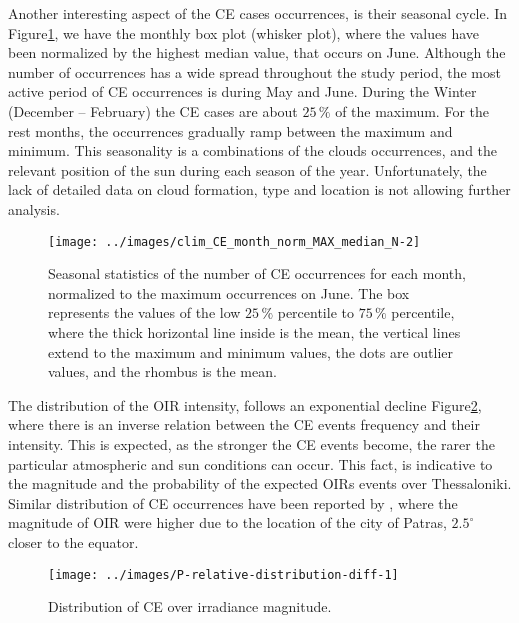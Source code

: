 \documentclass[preprint, 5p,
authoryear]{elsarticle} %
\begin{document}
Another interesting aspect of the CE cases occurrences, is their
seasonal cycle. In
Figure\nobreakspace{}\ref{fig:relative-month-occurrences}, we have the
monthly box plot (whisker plot), where the values have been normalized
by the highest median value, that occurs on June. Although the number of
occurrences has a wide spread throughout the study period, the most
active period of CE occurrences is during May and June. During the
Winter (December -- February) the CE cases are about \(25\,\%\) of the
maximum. For the rest months, the occurrences gradually ramp between the
maximum and minimum. This seasonality is a combinations of the clouds
occurrences, and the relevant position of the sun during each season of
the year. Unfortunately, the lack of detailed data on cloud formation,
type and location is not allowing further analysis.

\begin{figure}

{\centering \texttt{[image: ../images/clim\_CE\_month\_norm\_MAX\_median\_N-2]} 

}

\caption{Seasonal statistics of the number of CE occurrences for each month, normalized to the maximum occurrences on June. The box represents the values of the low $25\,\%$ percentile to $75\,\%$ percentile, where the thick horizontal line inside is the mean, the vertical lines extend to the maximum and minimum values, the dots are outlier values, and the rhombus is the mean.}\label{fig:relative-month-occurrences}
\end{figure}

The distribution of the OIR intensity, follows an exponential decline
Figure\nobreakspace{}\ref{fig:ovir-distribution}, where there is an
inverse relation between the CE events frequency and their intensity.
This is expected, as the stronger the CE events become, the rarer the
particular atmospheric and sun conditions can occur. This fact, is
indicative to the magnitude and the probability of the expected OIRs
events over Thessaloniki. Similar distribution of CE occurrences have
been reported by \citet{Vamvakas2020}, where the magnitude of OIR were
higher due to the location of the city of Patras, \(2.5^\circ\) closer
to the equator.

\begin{figure}

{\centering \texttt{[image: ../images/P-relative-distribution-diff-1]} 

}

\caption{Distribution of CE over irradiance magnitude.}\label{fig:ovir-distribution}
\end{figure}
\end{document}

